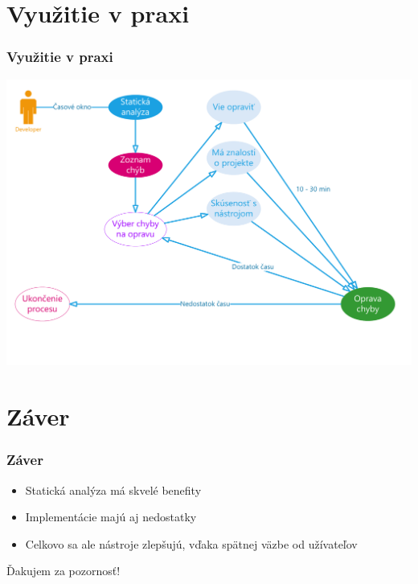 \documentclass{beamer}
\begin{document}
\section{Využitie v praxi}

\begin{frame}[fragile=singleslide]\frametitle{Využitie v praxi}
	\centerline{\includegraphics[scale=0.38]{vyuzitie.pdf}}
\end{frame}


\section*{Záver}

\begin{frame}[fragile=singleslide]\frametitle{Záver}
	\begin{itemize}
		\item Statická analýza má skvelé benefity
		\item Implementácie majú aj nedostatky
		\item Celkovo sa ale nástroje zlepšujú, vďaka spätnej väzbe od užívateľov
	\end{itemize}
\end{frame}

\begin{frame}
	\begin{center}
		\Huge{Ďakujem za pozornosť!}
	\end{center}
\end{frame}
\end{document}
